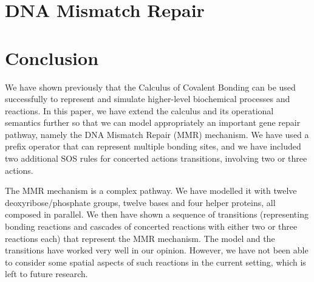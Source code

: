 \documentclass[review]{elsarticle}
\begin{document}
\section{DNA Mismatch Repair}\label{sec:dnamimatch}

%
\section{Conclusion}
We have shown previously that the Calculus of Covalent Bonding can be used successfully to represent and simulate higher-level biochemical processes and reactions. In this paper, we have extend the calculus and its operational semantics further so that we can model appropriately an important gene repair pathway, namely the DNA Mismatch Repair (MMR) mechanism. We have used a prefix operator that can represent 
multiple bonding sites,  and we have included two additional SOS rules for concerted actions transitions, involving two or three actions. 

The MMR mechanism is a complex pathway. We have modelled it with twelve deoxyribose/phosphate groups, twelve bases and four helper proteins, all composed in parallel. We then have shown a sequence of transitions (representing bonding reactions and cascades of concerted reactions with either two or three reactions each) that represent the MMR mechanism. The model and the transitions have worked very well in our opinion. However, we have not been able to consider some spatial aspects of such reactions in the current setting, which is left to future research.


\end{document}
